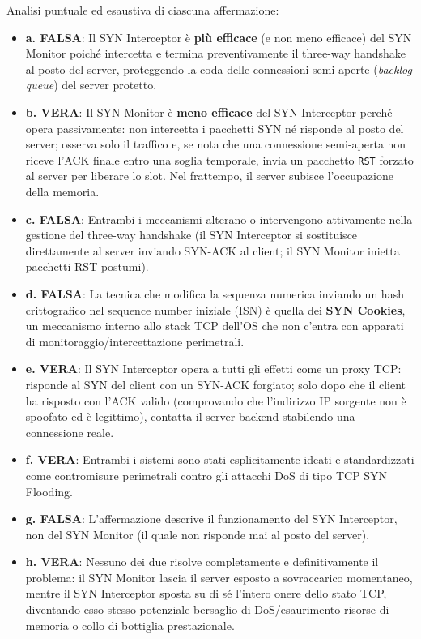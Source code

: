 \documentclass[11pt,a4paper]{article}
\begin{document}
\begin{solutionbox}
Analisi puntuale ed esaustiva di ciascuna affermazione:
\begin{itemize}
    \item \textbf{a. FALSA}: Il SYN Interceptor \`e \textbf{pi\`u efficace} (e non meno efficace) del SYN Monitor poich\'e intercetta e termina preventivamente il three-way handshake al posto del server, proteggendo la coda delle connessioni semi-aperte (\textit{backlog queue}) del server protetto.
    \item \textbf{b. VERA}: Il SYN Monitor \`e \textbf{meno efficace} del SYN Interceptor perch\'e opera passivamente: non intercetta i pacchetti SYN n\'e risponde al posto del server; osserva solo il traffico e, se nota che una connessione semi-aperta non riceve l'ACK finale entro una soglia temporale, invia un pacchetto \texttt{RST} forzato al server per liberare lo slot. Nel frattempo, il server subisce l'occupazione della memoria.
    \item \textbf{c. FALSA}: Entrambi i meccanismi alterano o intervengono attivamente nella gestione del three-way handshake (il SYN Interceptor si sostituisce direttamente al server inviando SYN-ACK al client; il SYN Monitor inietta pacchetti RST postumi).
    \item \textbf{d. FALSA}: La tecnica che modifica la sequenza numerica inviando un hash crittografico nel sequence number iniziale (ISN) \`e quella dei \textbf{SYN Cookies}, un meccanismo interno allo stack TCP dell'OS che non c'entra con apparati di monitoraggio/intercettazione perimetrali.
    \item \textbf{e. VERA}: Il SYN Interceptor opera a tutti gli effetti come un proxy TCP: risponde al SYN del client con un SYN-ACK forgiato; solo dopo che il client ha risposto con l'ACK valido (comprovando che l'indirizzo IP sorgente non \`e spoofato ed \`e legittimo), contatta il server backend stabilendo una connessione reale.
    \item \textbf{f. VERA}: Entrambi i sistemi sono stati esplicitamente ideati e standardizzati come contromisure perimetrali contro gli attacchi DoS di tipo TCP SYN Flooding.
    \item \textbf{g. FALSA}: L'affermazione descrive il funzionamento del SYN Interceptor, non del SYN Monitor (il quale non risponde mai al posto del server).
    \item \textbf{h. VERA}: Nessuno dei due risolve completamente e definitivamente il problema: il SYN Monitor lascia il server esposto a sovraccarico momentaneo, mentre il SYN Interceptor sposta su di s\'e l'intero onere dello stato TCP, diventando esso stesso potenziale bersaglio di DoS/esaurimento risorse di memoria o collo di bottiglia prestazionale.
\end{itemize}
\end{solutionbox}
\end{document}
